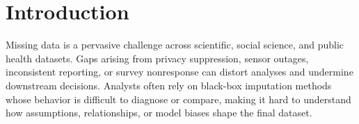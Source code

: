 \documentclass{egpubl}
\begin{document}
\begin{abstract}

\begin{CCSXML}
<ccs2012>
<concept>
<concept_id>10003120.10003145.10003147.10010365</concept_id>
<concept_desc>Human-centered computing~Visual analytics</concept_desc>
<concept_significance>500</concept_significance>
</concept>
</ccs2012>
\end{CCSXML}


\printccsdesc 

\end{abstract}


\section{Introduction}
\label{sec:introduction}
Missing data is a pervasive challenge across scientific, social science, and public health datasets. Gaps arising from privacy suppression, sensor outages, inconsistent reporting, or survey nonresponse can distort analyses and undermine downstream decisions. Analysts often rely on black-box imputation methods whose behavior is difficult to diagnose or compare, making it hard to understand how assumptions, relationships, or model biases shape the final dataset.
\end{document}
